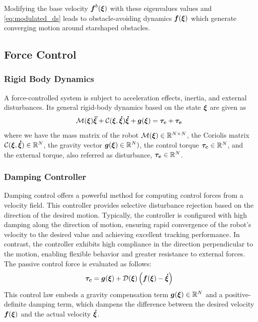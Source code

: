 Modifying the base velocity $\boldsymbol{f}^b(\boldsymbol{\xi})$ with these eigenvalues values and \eqref{eq:modulated_ds} leads to obstacle-avoiding dynamics $\boldsymbol{f}(\boldsymbol{\xi})$ which generate converging motion around starshaped obstacles.

\subsection{Force Control}

\subsubsection{Rigid Body Dynamics}
A force-controlled system is subject to acceleration effects, inertia, and external disturbances. Its general rigid-body dynamics based on the state $\boldsymbol{\xi}$ are given as
\begin{equation}
\matd{M}(\vecs\xi)\vecs{\ddot\xi} + \matd{C}(\vecs\xi, \vecs{\dot\xi})\vecs{\dot\xi} + \vect g(\vecs\xi) = \vecs{\tau_c} + \vecs{\tau_e}
 \label{eq:robot_dynamics}
\end{equation}
where we have the mass matrix of the robot $\mathcal{M}(\boldsymbol{\xi}) \in \mathbb{R}^{N \times N}$, the Coriolis matrix $\mathcal{C}(\boldsymbol{\xi},\boldsymbol{\dot\xi}) \in \mathbb{R}^N$, the gravity vector $\boldsymbol{g}(\boldsymbol{\xi}) \in \mathbb{R}^N)$, the control torque $\boldsymbol{\tau_c} \in \mathbb{R}^N$, and the external torque, also referred as disturbance, $\boldsymbol{\tau_e} \in \mathbb{R}^N$.

\subsubsection{Damping Controller}
Damping control \cite{kronander2015passive} offers a powerful method for computing control forces from a velocity field. This controller provides selective disturbance rejection based on the direction of the desired motion. Typically, the controller is configured with high damping along the direction of motion, ensuring rapid convergence of the robot's velocity to the desired value and achieving excellent tracking performance. In contrast, the controller exhibits high compliance in the direction perpendicular to the motion, enabling flexible behavior and greater resistance to external forces. The passive control force is evaluated as follows:
\begin{equation}
	\vecs{\tau_c} = \vect g (\vecs\xi) 
	+ \matd{D}(\vecs\xi) \left(\vecs f(\vecs\xi) - \vecs{\dot\xi} \right) 
\label{eq:control_command}
\end{equation}
This control law embeds a gravity compensation term $\boldsymbol{g} (\boldsymbol{\xi}) \in \mathbb{R}^N$ and a positive-definite damping term, which dampens the difference between the desired velocity $\boldsymbol{f}(\boldsymbol{\xi})$ and the actual velocity $\boldsymbol{\dot\xi}$.

